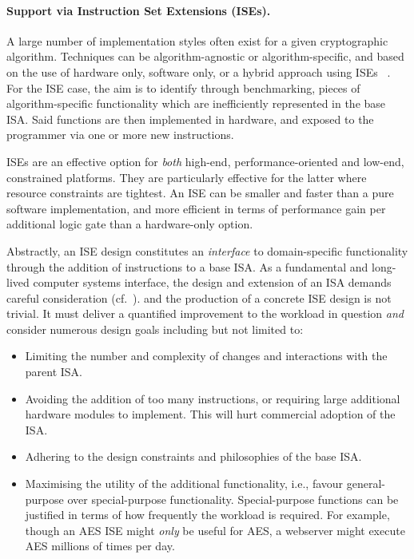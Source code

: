 
\paragraph{Support via Instruction Set Extensions (ISEs).}

A large number of implementation styles often exist
for a given cryptographic algorithm.
Techniques can be
   algorithm-agnostic
   or
   algorithm-specific,
and based on the use of   
   hardware              only,
                software only,
   or
   a hybrid approach using ISEs ~\cite{GalBer:11,BarGioMar:09,RegIen:16}.
For the ISE case, the aim is to identify through benchmarking, pieces of
algorithm-specific functionality which are inefficiently represented in the
base ISA.
Said functions are then implemented in hardware, and exposed to the
programmer via one or more new instructions.

ISEs are an effective option for {\em both}
high-end, performance-oriented
and
 low-end, constrained
platforms. 
They are particularly effective for the latter where resource constraints
are tightest.
An ISE can be smaller and faster than a pure software implementation,
and more efficient in terms of performance gain per additional logic gate
than a hardware-only option.

Abstractly, an ISE design constitutes
an {\em interface} to domain-specific functionality through the
addition of instructions to a base ISA.
As a fundamental and long-lived computer systems interface, the design
and extension of an ISA demands careful consideration
(cf.~\cite[Section 4]{Gueron:09}). 
and the production of a concrete ISE design is not trivial.
It must deliver a quantified improvement to the workload in 
question {\em and}
consider numerous design goals including but not limited to:

\begin{itemize}
\item Limiting the number and complexity of changes and interactions with the
    parent ISA.
\item Avoiding the addition of too many instructions, or requiring large
    additional hardware modules to implement. This will hurt commercial
    adoption of the ISA.
\item Adhering to the design constraints and philosophies of the base ISA.
\item Maximising the utility of the additional functionality,
      i.e.,
      favour general-purpose over special-purpose functionality.
      Special-purpose functions can be justified in terms of how frequently
      the workload is required.
      For example, though an AES ISE might {\em only}
      be useful for AES, a webserver might execute AES millions of times
      per day.
\end{itemize}

